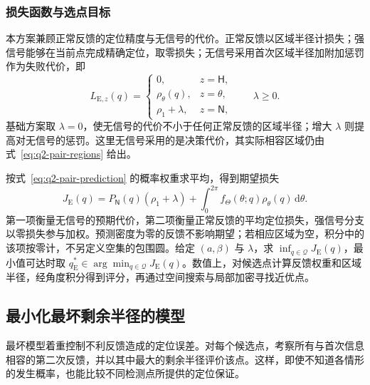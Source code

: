 \documentclass[UTF8,a4paper,zihao=-4,fontset=none]{ctexart}
\begin{document}
\subsubsection{损失函数与选点目标}

本方案兼顾正常反馈的定位精度与无信号的代价。正常反馈以区域半径计损失；强信号能够在当前点完成精确定位，取零损失；无信号采用首次区域半径加附加惩罚作为失败代价，即
\begin{equation}
 L_{\mathrm E,z}(q)=
 \begin{cases}
 0,&z=\mathsf H,\\
 \rho_\theta(q),&z=\theta,\\
 \rho_1+\lambda,&z=\mathsf N,
 \end{cases}
 \qquad \lambda\ge0.
\label{eq:q2-pair-expected-loss}
\end{equation}
基础方案取 \(\lambda=0\)，使无信号的代价不小于任何正常反馈的区域半径；增大 \(\lambda\) 则提高对无信号的惩罚。这里无信号采用的是决策代价，其实际相容区域仍由式~\eqref{eq:q2-pair-regions} 给出。

按式~\eqref{eq:q2-pair-prediction} 的概率权重求平均，得到期望损失
\begin{equation}
 J_{\mathrm E}(q)
 =P_{\mathsf N}(q)(\rho_1+\lambda)
 +\int_0^{2\pi}f_\Theta(\theta;q)\rho_\theta(q)\,\mathrm d\theta.
\label{eq:q2-pair-expected-objective}
\end{equation}
第一项衡量无信号的预期代价，第二项衡量正常反馈的平均定位损失，强信号分支以零损失参与加权。预测密度为零的反馈不影响期望；若相应区域为空，积分中的该项按零计，不另定义空集的包围圆。给定 \((a,\beta)\) 与 \(\lambda\)，求 \(\inf_{q\in\mathcal Q}J_{\mathrm E}(q)\)，最小值可达时取 \(q_{\mathrm E}^*\in\arg\min_{q\in\mathcal Q}J_{\mathrm E}(q)\)。数值上，对候选点计算反馈权重和区域半径，经角度积分得到评分，再通过空间搜索与局部加密寻找近优点。

\subsection{最小化最坏剩余半径的模型}

最坏模型着重控制不利反馈造成的定位误差。对每个候选点，考察所有与首次信息相容的第二次反馈，并以其中最大的剩余半径评价该点。这样，即使不知道各情形的发生概率，也能比较不同检测点所提供的定位保证。
\end{document}
